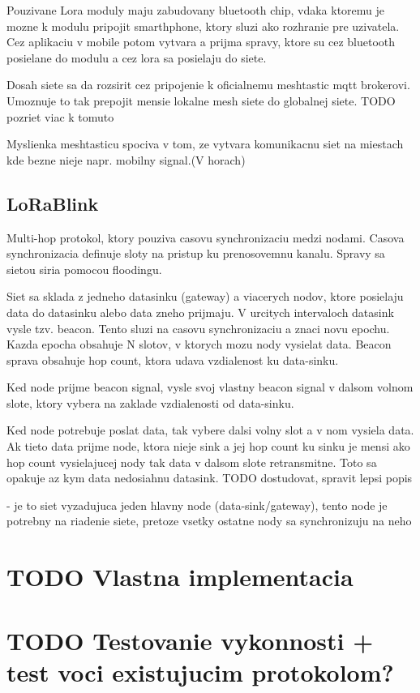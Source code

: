 \documentclass[czech,master]{diploma}
\begin{document}
Pouzivane Lora moduly maju zabudovany bluetooth chip, vdaka ktoremu je mozne k modulu pripojit smarthphone, ktory sluzi ako rozhranie pre
 uzivatela. Cez aplikaciu v mobile potom vytvara a prijma spravy, ktore su cez bluetooth posielane do modulu a cez lora sa posielaju do siete.

Dosah siete sa da rozsirit cez pripojenie k oficialnemu meshtastic mqtt brokerovi. Umoznuje to tak prepojit mensie lokalne mesh siete do globalnej siete. TODO pozriet viac k tomuto

Myslienka meshtasticu spociva v tom, ze vytvara komunikacnu siet na miestach kde bezne nieje napr. mobilny signal.(V horach)

\section{LoRaBlink}
Multi-hop protokol, ktory pouziva casovu synchronizaciu medzi nodami. Casova synchronizacia definuje sloty na pristup ku prenosovemnu kanalu.
Spravy sa sietou siria pomocou floodingu.

Siet sa sklada z jedneho datasinku (gateway) a viacerych nodov, ktore posielaju data do datasinku alebo data zneho prijmaju.
V urcitych intervaloch datasink vysle tzv. beacon. Tento sluzi na casovu synchronizaciu a znaci novu epochu. Kazda epocha obsahuje N 
slotov, v ktorych mozu nody vysielat data. Beacon sprava obsahuje hop count, ktora udava vzdialenost ku data-sinku.

Ked node prijme beacon signal, vysle svoj vlastny beacon signal v dalsom volnom slote, ktory vybera na zaklade vzdialenosti od data-sinku.

Ked node potrebuje poslat data, tak vybere dalsi volny slot a v nom vysiela data. Ak tieto data prijme node, ktora nieje sink a jej hop count ku sinku je mensi ako hop count
vysielajucej nody tak data v dalsom slote retransmitne. Toto sa opakuje az kym data nedosiahnu datasink. TODO dostudovat, spravit lepsi popis

- je to siet vyzadujuca jeden hlavny node (data-sink/gateway), tento node je potrebny na riadenie siete, pretoze vsetky ostatne nody sa synchronizuju na neho



\chapter{TODO Vlastna implementacia}
\chapter{TODO Testovanie vykonnosti + test voci existujucim protokolom?}
\end{document}
